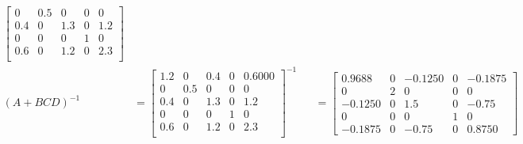 \documentclass[a4paper]{article}
\begin{document}
\begin{qalist}
\begin{align}
\begin{bmatrix}
						0 & 0.5 & 0 & 0 & 0 \\
						0.4 & 0 & 1.3 & 0 & 1.2 \\
						0 & 0 & 0 & 1 & 0 \\
						0.6 & 0 & 1.2 & 0 & 2.3 \\
					\end{bmatrix} \\
				{(A + BCD)}^{-1} &= {\begin{bmatrix}
						1.2 & 0 & 0.4 & 0 & 0.6000 \\
						0 & 0.5 & 0 & 0 & 0 \\
						0.4 & 0 & 1.3 & 0 & 1.2 \\
						0 & 0 & 0 & 1 & 0 \\
						0.6 & 0 & 1.2 & 0 & 2.3 \\
					\end{bmatrix}}^{-1} &&= \begin{bmatrix}
						0.9688 & 0 & -0.1250 & 0 & -0.1875 \\
						0 & 2 & 0 & 0 & 0 \\
						-0.1250 & 0 & 1.5 & 0 & -0.75 \\
						0 & 0 & 0 & 1 & 0 \\
						-0.1875 & 0 & -0.75 & 0& 0.8750
					\end{bmatrix}
			\end{align}
			

\end{qalist}
\end{document}
